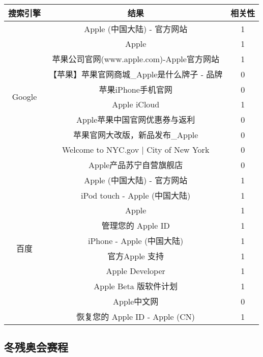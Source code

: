 \documentclass[a4paper]{article}
\begin{document}
\begin{center}
  \begin{tabular}{ |c|c|c| }
    \hline
    搜索引擎 & 结果 & 相关性 \\ \hline
    \multirow{10}{*}{Google}  & Apple (中国大陆) - 官方网站 & 1 \\ \cline{2-3}
    & Apple & 1 \\ \cline{2-3}
    & 苹果公司官网(www.apple.com)-Apple官方网站 & 1 \\ \cline{2-3}
    &【苹果】苹果官网商城\_Apple是什么牌子 - 品牌 & 0 \\ \cline{2-3}
    & 苹果iPhone手机官网 & 0 \\ \cline{2-3}
    & Apple iCloud & 1 \\ \cline{2-3}
    & Apple苹果中国官网优惠券与返利 & 0 \\ \cline{2-3}
    & 苹果官网大改版，新品发布\_Apple & 0 \\ \cline{2-3}
    & Welcome to NYC.gov | City of New York & 0 \\ \cline{2-3}
    & Apple产品苏宁自营旗舰店 & 0 \\ \cline{2-3}
    \hline\hline
    \multirow{10}{*}{百度}  & Apple (中国大陆) - 官方网站 & 1 \\ \cline{2-3}
    & iPod touch - Apple (中国大陆) & 1 \\ \cline{2-3}
    & Apple & 1 \\ \cline{2-3}
    & 管理您的 Apple ID & 1 \\ \cline{2-3}
    & iPhone - Apple (中国大陆) & 1 \\ \cline{2-3}
    & 官方Apple 支持 & 1 \\ \cline{2-3}
    & Apple Developer & 1 \\ \cline{2-3}
    & Apple Beta 版软件计划 & 1 \\ \cline{2-3}
    & Apple中文网 & 0 \\ \cline{2-3}
    & 恢复您的 Apple ID - Apple (CN) & 1 \\ \cline{2-3}
    \hline
  \end{tabular}
\end{center}
\pagebreak

\subsection{冬残奥会赛程}
\end{document}
